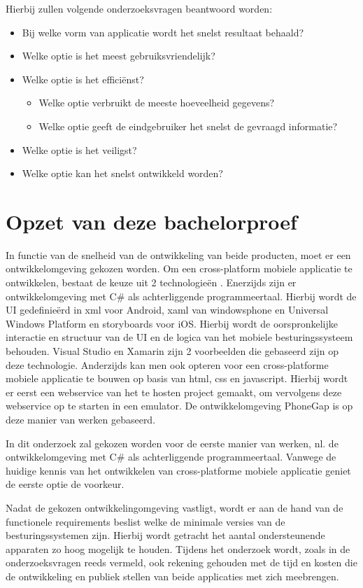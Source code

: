 Hierbij zullen volgende onderzoeksvragen beantwoord worden:
\begin{itemize}
  \item{Bij welke vorm van applicatie wordt het snelst resultaat behaald?}
  \item{Welke optie is het meest gebruiksvriendelijk?}
  \item{Welke optie is het efficiënst?}
  \begin{itemize}
    \item{Welke optie verbruikt de meeste hoeveelheid gegevens?}
    \item{Welke optie geeft de eindgebruiker het snelst de gevraagd informatie?}
  \end{itemize}
  \item{Welke optie is het veiligst?}
  \item{Welke optie kan het snelst ontwikkeld worden?}
\end{itemize}
\newpage
\section{Opzet van deze bachelorproef}
\label{sec:opzet-bachelorproef}

In functie van de snelheid van de ontwikkeling van beide producten, moet er een ontwikkelomgeving gekozen worden.
Om een cross-platform mobiele applicatie te ontwikkelen, bestaat de keuze uit 2 technologieën . Enerzijds zijn er
ontwikkelomgeving met C\# als achterliggende programmeertaal. Hierbij wordt de UI gedefinieërd in xml voor Android,
xaml van windowsphone en Universal Windows Platform en storyboards voor iOS. Hierbij wordt de oorspronkelijke interactie
en structuur van de UI en de logica van het mobiele besturingssysteem behouden. Visual Studio en Xamarin zijn 2 voorbeelden
die gebaseerd zijn op deze technologie. Anderzijds kan men ook opteren voor een cross-platforme mobiele applicatie te bouwen op basis van html, css en javascript.
Hierbij wordt er eerst een webservice van het te hosten project gemaakt, om vervolgens deze webservice op te starten in een emulator.
De ontwikkelomgeving PhoneGap is op deze manier van werken gebaseerd.

In dit onderzoek zal gekozen worden voor de eerste manier van werken, nl. de ontwikkelomgeving met C\# als achterliggende
programmeertaal. Vanwege de huidige kennis van het ontwikkelen van cross-platforme mobiele applicatie geniet de eerste optie de voorkeur.

Nadat de gekozen ontwikkelingomgeving vastligt, wordt er aan de hand van de functionele requirements beslist welke de
minimale versies van de besturingssystemen zijn. Hierbij wordt getracht het aantal ondersteunende apparaten zo hoog mogelijk te houden.
Tijdens het onderzoek wordt, zoals in de onderzoeksvragen reeds vermeld, ook rekening gehouden met de tijd en kosten die de ontwikkeling
en publiek stellen van beide applicaties met zich meebrengen.

